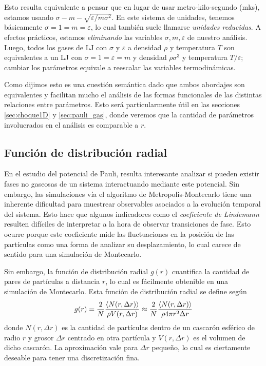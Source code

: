 Esto resulta equivalente a pensar que en lugar de usar metro-kilo-segundo (mks), estamos usando $\sigma - m - \sqrt{\varepsilon/m\sigma^2}$.
En este sistema de unidades, tenemos básicamente $\sigma=1=m=\varepsilon$, lo cual también suele llamarse \textit{unidades reducidas}.
A efectos prácticos, estamos \textit{eliminando} las variables $\sigma,m,\varepsilon$ de nuestro análisis.
Luego, todos los gases de LJ con $\sigma$ y $\varepsilon$ a densidad $\rho$ y temperatura $T$ son equivalentes a un LJ con $\sigma=1=\varepsilon=m$ y
densidad $\rho\sigma^3$ y temperatura $T/\varepsilon$; cambiar los parámetros equivale a reescalar las variables termodinámicas.

Como dijimos esto es una cuestión semántica dado que ambos abordajes son equivalentes y facilitan mucho el análisis de las formas funcionales de las distintas relaciones entre parámetros.
Esto será particularmente útil en las secciones \ref{sec:choque1D} y \ref{sec:pauli_gas}, donde veremos que la cantidad de parámetros involucrados en el análisis es comparable a $r$.


\subsection{Función de distribución radial}{\label{sec:intro_gr}}

En el estudio del potencial de Pauli, resulta interesante analizar si pueden existir fases no gaseosas de un sistema interactuando mediante este potencial.
Sin embargo, las simulaciones vía el algoritmo de Metropolis-Montecarlo tiene una inherente dificultad para muestrear observables asociados a la evolución temporal del sistema.
Esto hace que algunos indicadores como el \textit{coeficiente de Lindemann} resulten difíciles de interpretar a la hora de observar transiciones de fase.
Esto ocurre porque este coeficiente mide las fluctuaciones en la posición de las partículas como una forma de analizar su desplazamiento, lo cual carece de sentido para una simulación de Montecarlo.

Sin embargo, la función de distribución radial $g(r)$ cuantifica la cantidad de pares de partículas a distancia $r$, lo cual es fácilmente obtenible en una simulación de Montecarlo.
Esta función de distribución radial se define según 
\begin{equation}{\label{eq:def_gr}}
 g(r) = \frac{2}{N}\frac{\left< N(r,\Delta r) \right>}{\rho V(r,\Delta r)} \approx \frac{2}{N}\frac{\left< N(r,\Delta r) \right>}{\rho 4\pi  r^2\Delta r}
\end{equation}
donde $N(r,\Delta r)$ es la cantidad de partículas dentro de un cascarón esférico de radio $r$ y grosor $\Delta r$ centrado en otra partícula y $V(r,\Delta r)$ es el volumen de dicho cascarón\cite{BOOK:HAILE}.
La aproximación vale para $\Delta r$ pequeño, lo cual es ciertamente deseable para tener una discretización fina.

